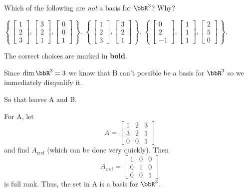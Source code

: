 \begin{questions}
  \question Which of the following are \emph{not} a basis for $\bbR^3$?
  Why?
  \begin{choices}
    \CorrectChoice
    $\displaystyle\left\{\,
      \begin{bmatrix}1\\2\\3\end{bmatrix},
      \begin{bmatrix}3\\2\\1\end{bmatrix},
      \begin{bmatrix}0\\0\\1\end{bmatrix}
      \,\right\}$.
    \choice
    $\displaystyle\left\{\,
      \begin{bmatrix}1\\2\\3\end{bmatrix},
      \begin{bmatrix}3\\2\\1\end{bmatrix}
      \,\right\}$.
    \CorrectChoice
    $\displaystyle\left\{\,
      \begin{bmatrix}0\\2\\-1\end{bmatrix},
      \begin{bmatrix}1\\1\\1\end{bmatrix},
      \begin{bmatrix}2\\5\\0\end{bmatrix}
      \,\right\}$.
  \end{choices}
  \begin{solution}
    The correct choices are marked in \textbf{bold}.

    Since $\dim\bbR^3=3$ we know that B can't possible be a basis for
    $\bbR^3$ so we immediately disqualify it.

    So that leaves A and B.

    For A, let
    \[
      A=\begin{bmatrix}%
        1&2&3\\
        3&2&1\\
        0&0&1
    \end{bmatrix}
    \]
    and find $A_{\text{rref}}$ (which can be done very quickly). Then
    \[
      A_{\text{rref}}=%
      \begin{bmatrix}%
        1&0&0\\
        0&1&0\\
        0&0&1
      \end{bmatrix}
    \]
    is full rank. Thus, the set in A is a basis for $\bbR^3$.


\end{solution}
\end{questions}
